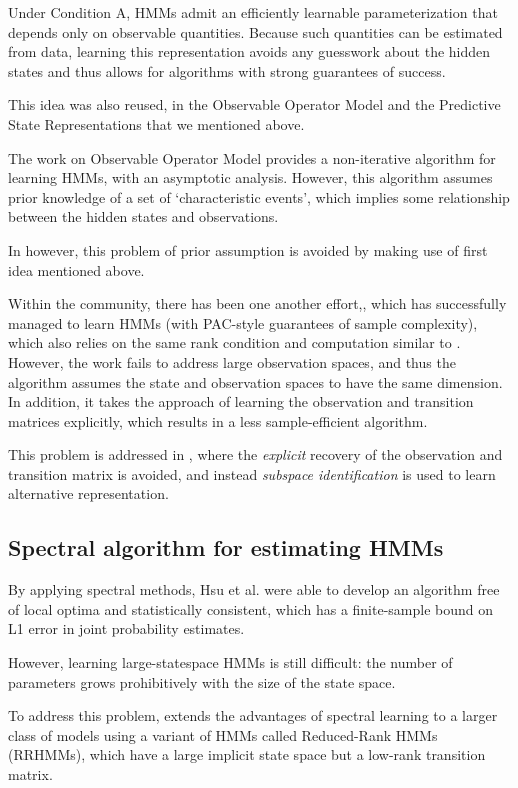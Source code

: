Under Condition A, HMMs admit an efficiently learnable parameterization that depends
only on observable quantities. Because such quantities can be estimated from data, learning
this representation avoids any guesswork about the hidden states and thus allows for algorithms
with strong guarantees of success.


This idea was also reused, in the Observable Operator Model and the Predictive State Representations that we mentioned above.

The work on Observable Operator Model provides a non-iterative algorithm for learning HMMs, with an asymptotic analysis. 
However, this algorithm assumes prior knowledge of a set of ‘characteristic events’, which implies some relationship between the hidden states and observations.

In \cite{ref2} however, this problem of prior assumption is avoided by making use of first idea mentioned above.


Within the community, there has been one another effort,\cite{ref17},  which has successfully managed to learn HMMs (with PAC-style guarantees of sample complexity), which also relies on the same rank condition and computation similar to \cite{ref2}. However, the work fails to address large observation spaces, and thus the algorithm assumes the state and observation spaces to have the same dimension. In addition, it takes the approach of learning the observation and transition matrices explicitly, which results in a less sample-efficient algorithm.

This problem is addressed in \cite{ref2}, where the \textit{explicit} recovery of the observation and transition matrix is avoided, and instead \textit{subspace identification} is used to learn alternative representation.

\subsection{Spectral algorithm for estimating HMMs}

By applying spectral methods, Hsu et al.\cite{ref2} were able to develop an algorithm free of local optima and statistically consistent, which has a finite-sample bound on L1 error in joint probability estimates. 

However, learning large-statespace HMMs is still difficult: the number of parameters
grows prohibitively with the size of the state space.

To address this problem, \cite{ref7} extends the advantages of spectral
learning to a larger class of models using a variant of HMMs called Reduced-Rank HMMs (RRHMMs), which have a large implicit state space but a low-rank transition matrix.

